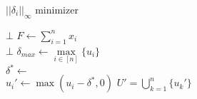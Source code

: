\begin{algorithm}[H]
   \label{dinf}
   \caption{$||\delta_i||_\infty$ minimizer}
      {\Return $\bot$ \label{dinfepsilonsinvalid}}
   $F \gets \sum\limits_{i=1}^{n}x_i$ \label{dinffinit} \\
      {\Return $\bot$ \label{dinfvinvalid}}
   $\delta_{max} \gets \max\limits_{i \in [n]}\{u_i\}$ \label{dinfdeltainit} \\
   $\delta^* \gets$  \label{dinfcallbs} \\
      {$u_i' \gets \max{(u_i - \delta^*, 0)}$ \label{dinfcapset}}
   \Return $U' = \bigcup\limits_{k=1}^{n}\{u_k'\}$ \label{dinfreturn}
\end{algorithm}
